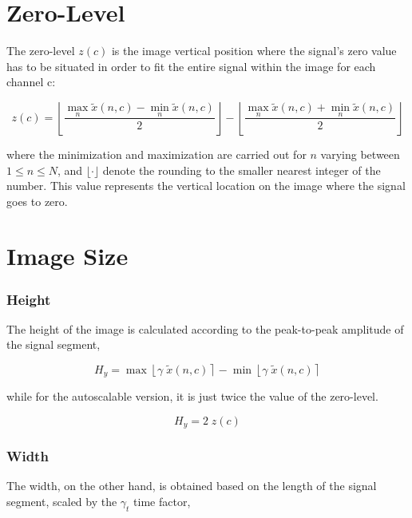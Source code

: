 \section{Zero-Level}

The zero-level $z(c)$ is the image vertical position where the signal's zero value has to be situated in order to fit the entire signal within the image for each channel c:

\begin{equation}
z(c) = \left \lfloor{ \frac{\max_{n} \tilde{x}(n,c)  - \min_{n} \tilde{x}(n,c) }{2} }\right \rfloor -   \left \lfloor{ \frac{\max_{n} \tilde{x}(n,c)  + \min_{n} \tilde{x}(n,c)}{ 2} }\right \rfloor
\label{eq:zerolevel}
\end{equation}

\noindent where the minimization and maximization are carried out for $n$ varying between ${1 \leq n\leq N}$, and $ \lfloor \cdot  \rfloor $ denote the rounding to the smaller nearest integer of the number.  This value represents the vertical location on the image where the signal goes to zero.  

\section{Image Size}

\subsubsection{Height}

The height of the image is calculated according to the peak-to-peak amplitude of the signal segment,

\begin{equation}
H_y = \max \left\lfloor \gamma \; \tilde{x}(n,c) \right\rceil  - \min \left\lfloor \gamma \; \tilde{x}(n,c) \right\rceil 
\label{eq:height}
\end{equation}

\noindent while for the autoscalable version, it is just twice the value of the zero-level.

\begin{equation}
H_y = 2 \; z(c)
\label{eq:autoscaleheight}
\end{equation}


\subsubsection{Width}

The width, on the other hand, is obtained based on the length of the signal segment, scaled by the $\gamma_t$  time factor,

